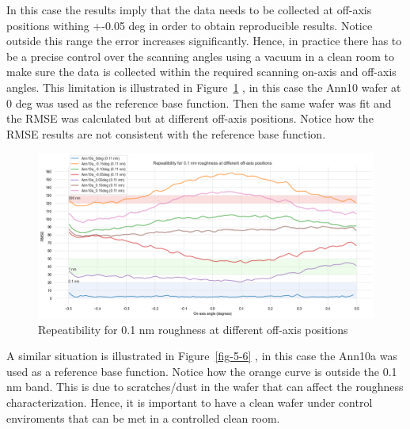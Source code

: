 \documentclass[
  letterpaper,
  DIV=11,
  numbers=noendperiod,
  oneside]{scrreprt}
\begin{document}
In this case the results imply that the data needs to be collected at
off-axis positions withing +-0.05 deg in order to obtain reproducible
results. Notice outside this range the error increases significantly.
Hence, in practice there has to be a precise control over the scanning
angles using a vacuum in a clean room to make sure the data is collected
within the required scanning on-axis and off-axis angles. This
limitation is illustrated in Figure~\ref{fig-5-5} , in this case the
Ann10 wafer at 0 deg was used as the reference base function. Then the
same wafer was fit and the RMSE was calculated but at different off-axis
positions. Notice how the RMSE results are not consistent with the
reference base function.

\begin{figure}

{\centering \includegraphics{notebooks/d_RMSE_files/figure-pdf/fig-5-5-output-1.png}

}

\caption{\label{fig-5-5}Repeatibility for 0.1 nm roughness at different
off-axis positions}

\end{figure}

A similar situation is illustrated in Figure~\ref{fig-5-6} , in this
case the Ann10a was used as a reference base function. Notice how the
orange curve is outside the 0.1 nm band. This is due to scratches/dust
in the wafer that can affect the roughness characterization. Hence, it
is important to have a clean wafer under control enviroments that can be
met in a controlled clean room.
\end{document}
